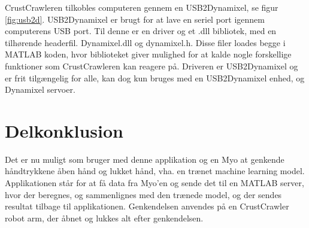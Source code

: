 
CrustCrawleren tilkobles computeren gennem en USB2Dynamixel, se figur \ref{fig:usb2d}. USB2Dynamixel er brugt for at lave en seriel port igennem computerens USB port. Til denne er en driver og et .dll bibliotek, med en tilhørende headerfil. Dynamixel.dll og dynamixel.h. Disse filer loades begge i MATLAB koden, hvor biblioteket giver mulighed for at kalde nogle forskellige funktioner som CrustCrawleren kan reagere på. Driveren er USB2Dynamixel \citep{agaverobot}  og er frit tilgængelig for alle, kan dog kun bruges med en USB2Dynamixel enhed, og Dynamixel servoer.

\section{Delkonklusion}
Det er nu muligt som bruger med denne applikation og en Myo at genkende håndtrykkene åben hånd og lukket hånd, vha. en trænet machine learning model. Applikationen står for at få data fra Myo'en og sende det til en MATLAB server, hvor der beregnes, og sammenlignes med den trænede model, og der sendes resultat tilbage til applikationen. Genkendelsen anvendes på en CrustCrawler robot arm, der åbnet og lukkes alt efter genkendelsen.